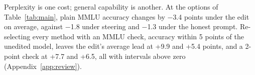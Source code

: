 Perplexity is one cost; general capability is another. At the options of Table~\ref{tab:main}, plain MMLU accuracy changes by $-$3.4 points under the edit on average, against $-$1.8 under steering and $-$1.3 under the honest prompt. Re-selecting every method with an MMLU check, accuracy within 5 points of the unedited model, leaves the edit's average lead at +9.9 and +5.4 points, and a 2-point check at +7.7 and +6.5, all with intervals above zero (Appendix~\ref{app:review}).